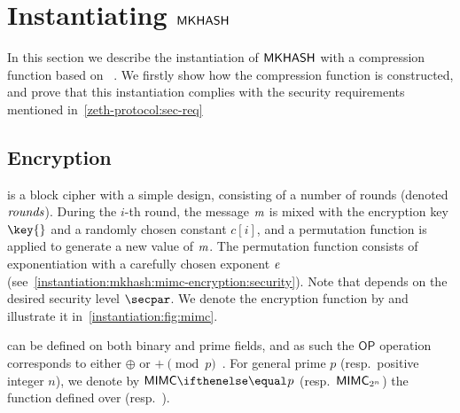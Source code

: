 
\section{Instantiating $\mathsf{MKHASH}$}\label{instantiation:mkhash}

In this section we describe the instantiation of $\mathsf{MKHASH}$ with a compression function based on \mimc{}~\cite{albrecht2016mimc}. We firstly show how the compression function is constructed, and prove that this instantiation complies with the security requirements mentioned in~\cref{zeth-protocol:sec-req}

\subsection{\mimc{} Encryption}\label{instantiation:mkhash:mimc-encryption}

\mimc{} is a block cipher with a simple design, consisting of a number of rounds (denoted $\mathit{rounds}$). During the $i$-th round, the message $\mathit{m}$ is mixed with the encryption key $\key{}$ and a randomly chosen constant $c[i]$, and a permutation function is applied to generate a new value of $\mathit{m}$. The permutation function consists of exponentiation with a carefully chosen exponent $\mathit{e}{}$ (see~\cref{instantiation:mkhash:mimc-encryption:security}). Note that \rounds{} depends on the desired security level $\secpar$. We denote the encryption function by \mimcEnc{} and illustrate it in~\cref{instantiation:fig:mimc}.

\begin{figure*}[ht]
    \centering
    \caption{\mimc{} Encryption function.}\label{instantiation:fig:mimc}
\end{figure*}

\mimcEnc{} can be defined on both binary and prime fields, and as such the $\mathsf{OP}$ operation corresponds to either $\oplus$ or $+ \pmod{p}$~\cite{albrecht2016mimc, grassi2016mpc}.
For general prime $p$ (resp.~positive integer $n$), we denote by $\mimcPrime{p}$ (resp.~$\mathsf{MIMC{}}_{2^n}$) the \mimcEnc{} function defined over  (resp.~).

